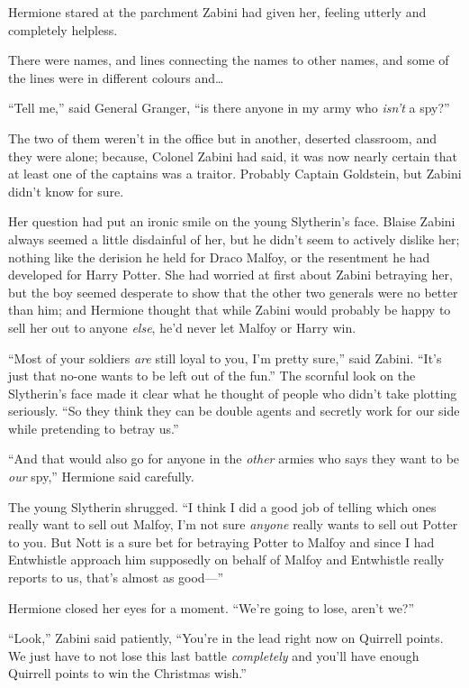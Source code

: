 Hermione stared at the parchment Zabini had given her, feeling utterly and completely helpless.

There were names, and lines connecting the names to other names, and some of the lines were in different colours and…

“Tell me,” said General Granger, “is there anyone in my army who \emph{isn’t} a spy?”

The two of them weren’t in the office but in another, deserted classroom, and they were alone; because, Colonel Zabini had said, it was now nearly certain that at least one of the captains was a traitor. Probably Captain Goldstein, but Zabini didn’t know for sure.

Her question had put an ironic smile on the young Slytherin’s face. Blaise Zabini always seemed a little disdainful of her, but he didn’t seem to actively dislike her; nothing like the derision he held for Draco Malfoy, or the resentment he had developed for Harry Potter. She had worried at first about Zabini betraying her, but the boy seemed desperate to show that the other two generals were no better than him; and Hermione thought that while Zabini would probably be happy to sell her out to anyone \emph{else}, he’d never let Malfoy or Harry win.

“Most of your soldiers \emph{are} still loyal to you, I’m pretty sure,” said Zabini.
“It’s just that no-one wants to be left out of the fun.” The scornful look on the Slytherin’s face made it clear what he thought of people who didn’t take plotting seriously.
“So they think they can be double agents and secretly work for our side while pretending to betray us.”

“And that would also go for anyone in the \emph{other} armies who says they want to be \emph{our} spy,” Hermione said carefully.

The young Slytherin shrugged.
“I think I did a good job of telling which ones really want to sell out Malfoy, I’m not sure \emph{anyone} really wants to sell out Potter to you. But Nott is a sure bet for betraying Potter to Malfoy and since I had Entwhistle approach him supposedly on behalf of Malfoy and Entwhistle really reports to us, that’s almost as good—”

Hermione closed her eyes for a moment.
“We’re going to lose, aren’t we?”

“Look,” Zabini said patiently,
“You’re in the lead right now on Quirrell points. We just have to not lose this last battle \emph{completely} and you’ll have enough Quirrell points to win the Christmas wish.”

